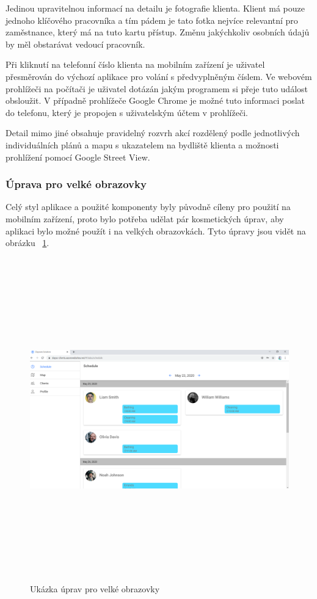 \documentclass[
  biblatex,
  glossaries,
  index
]{kidiplom}
\begin{document}
Jedinou upravitelnou informací na detailu je fotografie klienta. Klient má pouze jednoho klíčového pracovníka a tím pádem je tato fotka nejvíce relevantní pro zaměstnance, který má na tuto kartu přístup. Změnu jakýchkoliv osobních údajů by měl obstarávat vedoucí pracovník. 

Při kliknutí na telefonní číslo klienta na mobilním zařízení je uživatel přesměrován do výchozí aplikace pro volání s předvyplněným číslem. Ve webovém prohlížeči na počítači je uživatel dotázán jakým programem si přeje tuto událost obsloužit. V případně prohlížeče Google Chrome je možné tuto informaci poslat do telefonu, který je propojen s uživatelským účtem v prohlížeči.

Detail mimo jiné obsahuje pravidelný rozvrh akcí rozdělený podle jednotlivých individuálních plánů a mapu s ukazatelem na bydliště klienta a možnosti prohlížení pomocí Google Street View.

\subsubsection{Úprava pro velké obrazovky}
Celý styl aplikace a použité komponenty byly původně cíleny pro použití na mobilním zařízení, proto bylo potřeba udělat pár kosmetických úprav, aby aplikaci bylo možné použít i na velkých obrazovkách. Tyto úpravy jsou vidět na obrázku ~\ref{fig:bigScreen}. 

\begin{figure}[H]
  	\centering
 	 \includegraphics[width=14cm,height=14cm,keepaspectratio]{big_screen}
 	 \caption{Ukázka úprav pro velké obrazovky}
 	 \label{fig:bigScreen}
\end{figure}
\end{document}
